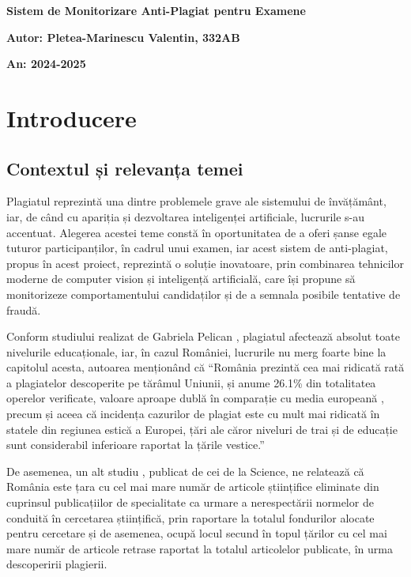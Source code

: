 \documentclass[12pt,a4paper]{article}
\begin{document}
\begin{titlepage}
    \centering
    \vspace*{\fill}
    {\huge\bfseries Sistem de Monitorizare Anti-Plagiat pentru Examene \par}
    \vspace*{\fill}
    \raggedright
    {\large\bfseries Autor: Pletea-Marinescu Valentin, 332AB \par}
    {\large\bfseries An: 2024-2025 \par}
\end{titlepage}

\tableofcontents
\newpage

\section{Introducere}

\subsection{Contextul și relevanța temei}

Plagiatul reprezintă una dintre problemele grave ale sistemului de
învățământ, iar, de când cu apariția și dezvoltarea inteligenței
artificiale, lucrurile s-au accentuat. Alegerea acestei teme constă în
oportunitatea de a oferi șanse egale tuturor participanților, în
cadrul unui examen, iar acest sistem de anti-plagiat, propus în acest
proiect, reprezintă o soluție inovatoare, prin combinarea tehnicilor
moderne de computer vision și inteligență artificială, care își
propune să monitorizeze comportamentului candidaților și de a semnala
posibile tentative de fraudă.

Conform studiului realizat de Gabriela Pelican \cite{pelican}, plagiatul
afectează absolut toate nivelurile educaționale, iar, în cazul
României, lucrurile nu merg foarte bine la capitolul acesta, autoarea
menționând că ``România prezintă cea mai ridicată rată a plagiatelor
descoperite pe tărâmul Uniunii, și anume 26.1\% din totalitatea
operelor verificate, valoare aproape dublă în comparație cu media
europeană , precum și aceea că incidența cazurilor de plagiat este cu
mult mai ridicată în statele din regiunea estică a Europei, țări ale
căror niveluri de trai și de educație sunt considerabil inferioare
raportat la țările vestice.''

De asemenea, un alt studiu \cite{science}, publicat de cei de la Science, ne
relatează că România este țara cu cel mai mare număr de articole
științifice eliminate din cuprinsul publicațiilor de specialitate ca
urmare a nerespectării normelor de conduită în cercetarea științifică,
prin raportare la totalul fondurilor alocate pentru cercetare și de
asemenea, ocupă locul secund în topul țărilor cu cel mai mare număr de
articole retrase raportat la totalul articolelor publicate, în urma
descoperirii plagierii.
\end{document}
